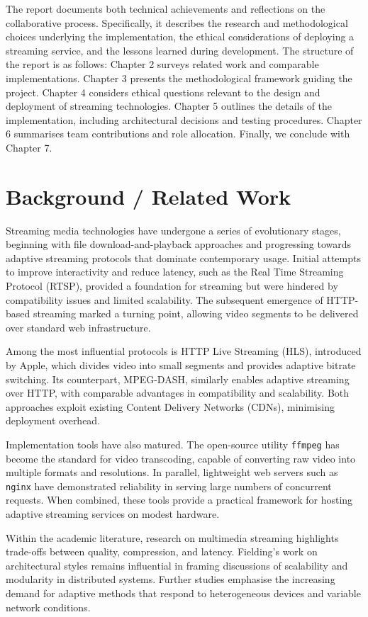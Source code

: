 \documentclass[11pt]{report}
\begin{document}
The report documents both technical achievements and reflections on the collaborative process. Specifically, it describes the research and methodological choices underlying the implementation, the ethical considerations of deploying a streaming service, and the lessons learned during development. The structure of the report is as follows: Chapter 2 surveys related work and comparable implementations. Chapter 3 presents the methodological framework guiding the project. Chapter 4 considers ethical questions relevant to the design and deployment of streaming technologies. Chapter 5 outlines the details of the implementation, including architectural decisions and testing procedures. Chapter 6 summarises team contributions and role allocation. Finally, we conclude with Chapter 7.

\chapter{Background / Related Work}
Streaming media technologies have undergone a series of evolutionary stages, beginning with file download-and-playback approaches and progressing towards adaptive streaming protocols that dominate contemporary usage. Initial attempts to improve interactivity and reduce latency, such as the Real Time Streaming Protocol (RTSP), provided a foundation for streaming but were hindered by compatibility issues and limited scalability. The subsequent emergence of HTTP-based streaming marked a turning point, allowing video segments to be delivered over standard web infrastructure.

Among the most influential protocols is HTTP Live Streaming (HLS), introduced by Apple, which divides video into small segments and provides adaptive bitrate switching. Its counterpart, MPEG-DASH, similarly enables adaptive streaming over HTTP, with comparable advantages in compatibility and scalability. Both approaches exploit existing Content Delivery Networks (CDNs), minimising deployment overhead.

Implementation tools have also matured. The open-source utility \texttt{ffmpeg} has become the standard for video transcoding, capable of converting raw video into multiple formats and resolutions. In parallel, lightweight web servers such as \texttt{nginx} have demonstrated reliability in serving large numbers of concurrent requests. When combined, these tools provide a practical framework for hosting adaptive streaming services on modest hardware.

Within the academic literature, research on multimedia streaming highlights trade-offs between quality, compression, and latency. Fielding’s \cite{fielding2000} work on architectural styles remains influential in framing discussions of scalability and modularity in distributed systems. Further studies emphasise the increasing demand for adaptive methods that respond to heterogeneous devices and variable network conditions.
\end{document}
